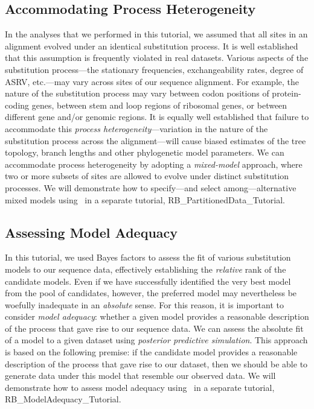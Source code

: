 \subsection{Accommodating Process Heterogeneity}
In the analyses that we performed in this tutorial, we assumed that all sites in an alignment evolved under an identical substitution process.
It is well established that this assumption is frequently violated in real datasets.
Various aspects of the substitution process---the stationary frequencies, exchangeability rates, degree of ASRV, etc.---may vary across sites of our sequence alignment.
For example, the nature of the substitution process may vary between codon positions of protein-coding genes, between stem and loop regions of ribosomal genes, or between different gene and/or genomic regions. 
It is equally well established that failure to accommodate this \textit{process heterogeneity}---variation in the nature of the substitution process across the alignment---will cause biased estimates of the tree topology, branch lengths and other phylogenetic model parameters.
We can accommodate process heterogeneity by adopting a \emph{mixed-model} approach, where two or more subsets of sites are allowed to evolve under distinct substitution processes.
We will demonstrate how to specify---and select among---alternative mixed models using \RevBayes~in a separate tutorial, RB\_PartitionedData\_Tutorial.

\subsection{Assessing Model Adequacy}
In this tutorial, we used Bayes factors to assess the fit of various substitution models to our sequence data, effectively establishing the \emph{relative} rank of the candidate models.
Even if we have successfully identified the very best model from the pool of candidates, however, the preferred model may nevertheless be woefully inadequate in an \emph{absolute} sense. 
For this reason, it is important to consider \emph{model adequacy}: whether a given model provides a reasonable description of the process that gave rise to our sequence data. 
We can assess the absolute fit of a model to a given dataset using \emph{posterior predictive simulation}.
This approach is based on the following premise: if the candidate model provides a reasonable description of the process that gave rise to our dataset, then we should be able to generate data under this model that resemble our observed data.
We will demonstrate how to assess model adequacy using \RevBayes~in a separate tutorial, RB\_ModelAdequacy\_Tutorial.

